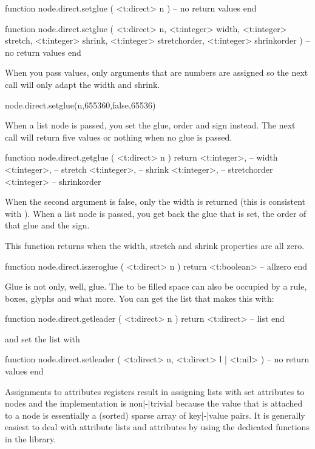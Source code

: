 \starttyping[option=LUA]
function node.direct.setglue ( <t:direct> n )
    -- no return values
end

function node.direct.setglue (
    <t:direct>  n,
    <t:integer> width,
    <t:integer> stretch,
    <t:integer> shrink,
    <t:integer> stretchorder,
    <t:integer> shrinkorder
)
    -- no return values
end
\stoptyping

When you pass values, only arguments that are numbers are assigned so the next
call will only adapt the width and shrink.

\starttyping[option=LUA]
node.direct.setglue(n,655360,false,65536)
\stoptyping


When a list node is passed, you set the glue, order and sign instead. The next
call will return five values or nothing when no glue is passed.

\starttyping[option=LUA]
function node.direct.getglue ( <t:direct> n )
    return
        <t:integer>, -- width
        <t:integer>, -- stretch
        <t:integer>, -- shrink
        <t:integer>, -- stretchorder
        <t:integer>  -- shrinkorder
\stoptyping

When the second argument is false, only the width is returned (this is consistent
with ). When a list node is passed, you get back the glue that is
set, the order of that glue and the sign.

This function returns  when the width, stretch and shrink properties
are all zero.

\starttyping[option=LUA]
function node.direct.iszeroglue ( <t:direct> n )
    return <t:boolean> -- allzero
end
\stoptyping

Glue is not only, well, glue. The to be filled space can also be occupied by a rule,
boxes, glyphs and what more. You can get the list that makes this with:

\starttyping[option=LUA]
function node.direct.getleader ( <t:direct> n )
    return <t:direct> -- list
end
\stoptyping

and set the list with

\starttyping[option=LUA]
function node.direct.setleader ( <t:direct> n, <t:direct> l | <t:nil> )
    -- no return values
end
\stoptyping

\stopsubsection

\startsubsection[title={Attributes}]

Assignments to attributes registers result in assigning lists with set attributes
to nodes and the implementation is non|-|trivial because the value that is
attached to a node is essentially a (sorted) sparse array of key|-|value pairs.
It is generally easiest to deal with attribute lists and attributes by using the
dedicated functions in the  library.

